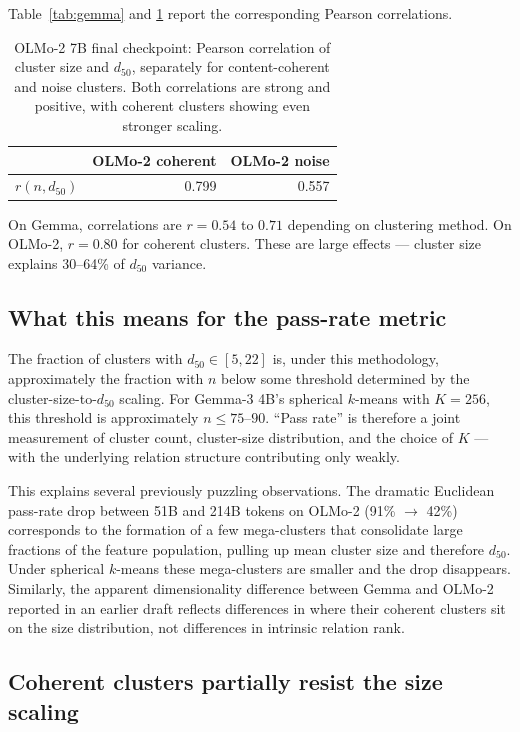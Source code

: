 \documentclass[11pt,letterpaper]{article}
\begin{document}
Table~\ref{tab:gemma} and \ref{tab:olmo-rn} report the corresponding Pearson correlations.

\begin{table}[ht]
\centering
\small
\begin{tabular}{lrr}
\toprule
 & OLMo-2 coherent & OLMo-2 noise \\
\midrule
$r(n, d_{50})$ & 0.799 & 0.557 \\
\bottomrule
\end{tabular}
\caption{OLMo-2 7B final checkpoint: Pearson correlation of cluster size and $d_{50}$, separately for content-coherent and noise clusters. Both correlations are strong and positive, with coherent clusters showing even stronger scaling.}
\label{tab:olmo-rn}
\end{table}

On Gemma, correlations are $r = 0.54$ to $0.71$ depending on clustering method. On OLMo-2, $r = 0.80$ for coherent clusters. These are large effects --- cluster size explains 30--64\% of $d_{50}$ variance.

\subsection{What this means for the pass-rate metric}

The fraction of clusters with $d_{50} \in [5, 22]$ is, under this methodology, approximately the fraction with $n$ below some threshold determined by the cluster-size-to-$d_{50}$ scaling. For Gemma-3 4B's spherical $k$-means with $K=256$, this threshold is approximately $n \leq 75$--$90$. ``Pass rate'' is therefore a joint measurement of cluster count, cluster-size distribution, and the choice of $K$ --- with the underlying relation structure contributing only weakly.

This explains several previously puzzling observations. The dramatic Euclidean pass-rate drop between 51B and 214B tokens on OLMo-2 (91\% $\to$ 42\%) corresponds to the formation of a few mega-clusters that consolidate large fractions of the feature population, pulling up mean cluster size and therefore $d_{50}$. Under spherical $k$-means these mega-clusters are smaller and the drop disappears. Similarly, the apparent dimensionality difference between Gemma and OLMo-2 reported in an earlier draft reflects differences in where their coherent clusters sit on the size distribution, not differences in intrinsic relation rank.

\subsection{Coherent clusters partially resist the size scaling}
\end{document}
